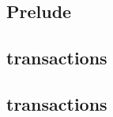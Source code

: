 \subsection{Prelude}                           \label{txn data: processing: sysi: prelude}    
\subsection{\cite{eip-4788} transactions}    \label{txn data: processing: sysi: eip 4788}   
\subsection{\cite{eip-2935} transactions}    \label{txn data: processing: sysi: eip 2935}   
